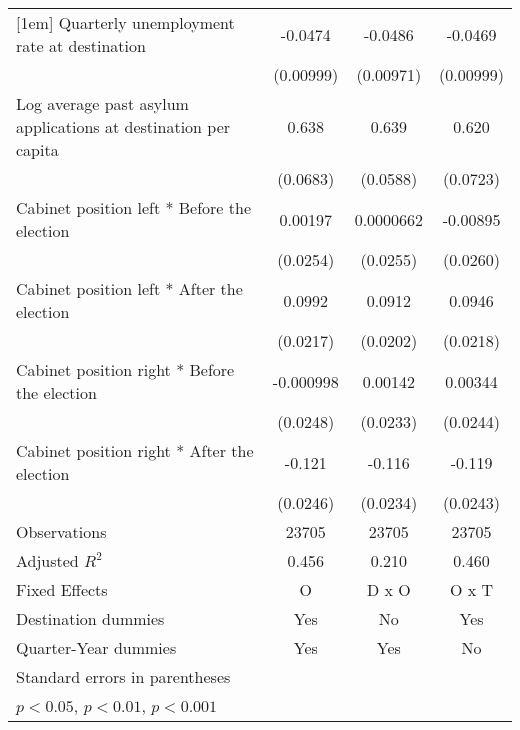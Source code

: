 \begin{table}[htbp]
\begin{tabular}{l*{3}{c}}
[1em]
Quarterly unemployment rate at destination&     -0.0474\sym{***}&     -0.0486\sym{***}&     -0.0469\sym{***}\\
                    &   (0.00999)         &   (0.00971)         &   (0.00999)         \\
[1em]
Log average past asylum applications at destination per capita&       0.638\sym{***}&       0.639\sym{***}&       0.620\sym{***}\\
                    &    (0.0683)         &    (0.0588)         &    (0.0723)         \\
[1em]
Cabinet position left * Before the election&     0.00197         &   0.0000662         &    -0.00895         \\
                    &    (0.0254)         &    (0.0255)         &    (0.0260)         \\
[1em]
Cabinet position left * After the election&      0.0992\sym{***}&      0.0912\sym{***}&      0.0946\sym{***}\\
                    &    (0.0217)         &    (0.0202)         &    (0.0218)         \\
[1em]
Cabinet position right * Before the election&   -0.000998         &     0.00142         &     0.00344         \\
                    &    (0.0248)         &    (0.0233)         &    (0.0244)         \\
[1em]
Cabinet position right * After the election&      -0.121\sym{***}&      -0.116\sym{***}&      -0.119\sym{***}\\
                    &    (0.0246)         &    (0.0234)         &    (0.0243)         \\
\hline
Observations        &       23705         &       23705         &       23705         \\
Adjusted \(R^{2}\)  &       0.456         &       0.210         &       0.460         \\
Fixed Effects       &           O         &       D x O         &       O x T         \\
Destination dummies &         Yes         &          No         &         Yes         \\
Quarter-Year dummies&         Yes         &         Yes         &          No         \\
\hline\hline
\multicolumn{4}{l}{\footnotesize Standard errors in parentheses}\\
\multicolumn{4}{l}{\footnotesize \sym{*} \(p<0.05\), \sym{**} \(p<0.01\), \sym{***} \(p<0.001\)}\\
\end{tabular}
\end{table}
